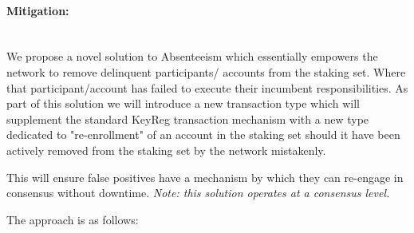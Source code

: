 \documentclass[11pt,a4paper]{article}
\begin{document}
\paragraph{Mitigation:} \mbox{}\\
We propose a novel solution to Absenteeism which essentially empowers the network to remove delinquent participants/
accounts from the staking set. Where that participant/account has failed to execute their incumbent responsibilities.
As part of this solution we will introduce a new transaction type which will supplement the standard \gls{KeyReg} 
transaction mechanism with a new type dedicated to "re-enrollment" of an account in the staking set should it have been 
actively removed from the staking set by the network mistakenly.

This will ensure false positives have a mechanism by which they can re-engage in consensus without downtime.
\emph{Note: this solution operates at a consensus level.}

The approach is as follows:
\end{document}
